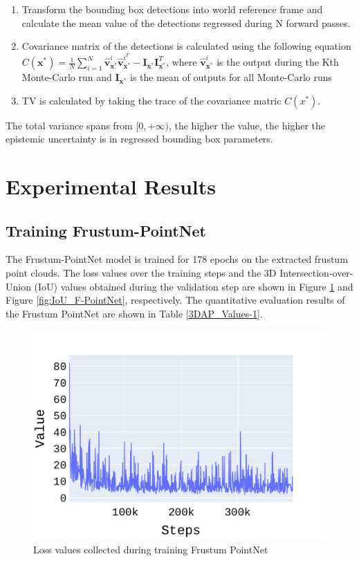 \documentclass[10pt,twocolumn,letterpaper]{article}
\begin{document}
         \begin{enumerate}
             \item Transform the bounding box detections into world reference frame and calculate the mean value of the detections regressed during N forward passes.
             \item Covariance matrix of the detections is calculated using the following equation $C\left(\mathbf{x}^{*}\right)=\frac{1}{N} \sum_{i=1}^{N} \hat{\mathbf{v}}_{\mathbf{x}^{*}}^{i} \hat{\mathbf{v}}_{\mathbf{x}^{*}}^{i^{T}}-\mathbf{I}_{\mathbf{x}^{*}} \mathbf{I}_{\mathbf{x}^{*}}^{T}$, where $\hat{\mathbf{v}}_{\mathbf{x}^{*}}^{i}$ is the output during the Kth Monte-Carlo run and $\mathbf{I}_{\mathbf{x}^{*}}$ is the mean of outputs for all Monte-Carlo runs             
             \item TV is calculated by taking the trace of the covariance matric $C(x^{*})$.
         \end{enumerate}
         
         The total variance spans from $[0,+\infty)$, the higher the value, the higher the epistemic uncertainty is in regressed bounding box parameters.
\section{Experimental Results}
\subsection{Training Frustum-PointNet }
The Frustum-PointNet \cite{FPointnet2018} model is trained for 178 epochs on the extracted frustum point clouds. The loss values over the training steps and the 3D Intersection-over-Union (IoU) values obtained during the validation step are shown in Figure \ref{fig:Loss_F-PointNet} and Figure \ref{fig:IoU_F-PointNet}, respectively. The quantitative evaluation results of the Frustum PointNet are shown in Table \ref{3DAP_Values-1}.

\begin{figure}[!htbp]
	\centering
	\includegraphics[scale = 0.4]{./images/LYFT_Detections/total_loss_1.pdf}
	\caption{Loss values collected during training Frustum PointNet}
	\label{fig:Loss_F-PointNet}
\end{figure}  
\end{document}
